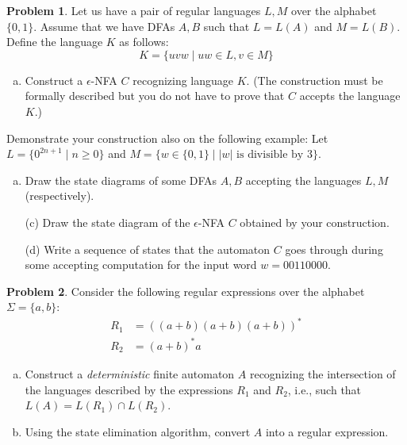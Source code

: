 \documentclass[a4paper,12pt]{article}
\theoremstyle{definition}
\newtheorem{problem}{Problem}
\begin{document}
\begin{problem}
    Let us have a pair of regular languages $L,M$ over the alphabet $\{0,1\}$. Assume that we have DFAs $A,B$ such that $L=L(A)$ and $M=L(B)$. Define the language $K$ as follows:
	$$K=\{uvw\mid uw\in L, v\in M\}$$

    \begin{enumerate}[(a)]	
		\item Construct a $\epsilon$-NFA $C$ recognizing language $K$. 
		(The construction must be formally described but you do not have to prove that $C$ accepts the language $K$.)
	\end{enumerate}
	Demonstrate your construction also on the following example: Let $L=\{0^{2n+1}\mid n\geq 0\}$ and $M=\{w\in\{0,1\}\mid |w|\text{ is divisible by 3}\}$.
	
	\smallskip
	\begin{enumerate}[(b)]
		\item Draw the state diagrams of some DFAs $A,B$ accepting the languages $L,M$ (respectively). 
		\item[(c)] Draw the state diagram of the $\epsilon$-NFA $C$ obtained by your construction.
		\item[(d)] Write a sequence of states that the automaton $C$ goes through during some accepting computation for the input word $w=00110000$.
	\end{enumerate}    
  
\end{problem}


\bigskip


\begin{problem}
    Consider the following regular expressions over the alphabet $\Sigma=\{a,b\}$:
    \begin{align*}
        R_1&=((a + b)(a + b)(a + b))^*\\
        R_2&=(a+b)^*a
    \end{align*}
    \begin{enumerate}[(a)]
        \item Construct a \emph{deterministic} finite automaton $A$ recognizing the intersection of the languages described by the expressions $R_1$ and $R_2$, i.e., such that $L(A)= L(R_1) \cap L(R_2)$.
        \item Using the state elimination algorithm, convert $A$ into a regular expression.
    \end{enumerate}
\end{problem}


\bigskip
\end{document}
